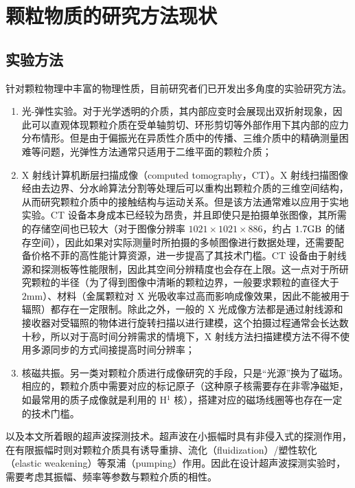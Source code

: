\section{颗粒物质的研究方法现状}


\subsection{实验方法}

针对颗粒物理中丰富的物理性质，目前研究者们已开发出多角度的实验研究方法。

\begin{enumerate}
  \item 光-弹性实验\cite{photoelasticimetry}。对于光学透明的介质，其内部应变时会展现出双折射现象，因此可以直观体现颗粒介质在受单轴剪切、环形剪切等外部作用下其内部的应力分布情形。但是由于偏振光在异质性介质中的传播、三维介质中的精确测量困难等问题\cite{Non-Destructive_3D_Photoelasticity}，光弹性方法通常只适用于二维平面的颗粒介质；
  \item X 射线计算机断层扫描成像（computed tomography，CT）\cite{PhysRevE.68.020301}。X 射线扫描图像经由去边界、分水岭算法分割等处理后可以重构出颗粒介质的三维空间结构，从而研究颗粒介质中的接触结构与运动关系。但是该方法通常难以应用于实地实验。CT 设备本身成本已经较为昂贵，并且即使只是拍摄单张图像，其所需的存储空间也已较大（对于图像分辨率 $1021\times 1021 \times 886$，约占 $1.7\unit{\giga\byte}$ 的储存空间\cite{xujiazhao}），因此如果对实际测量时所拍摄的多帧图像进行数据处理，还需要配备价格不菲的高性能计算资源，进一步提高了其技术门槛。CT 设备由于射线源和探测板等性能限制，因此其空间分辨精度也会存在上限。这一点对于所研究颗粒的半径（为了得到图像中清晰的颗粒边界，一般要求颗粒的直径大于 $2\unit{\milli\meter}$）、材料（金属颗粒对 X 光吸收率过高而影响成像效果，因此不能被用于辐照）都存在一定限制。除此之外，一般的 X 光成像方法都是通过射线源和接收器对受辐照的物体进行旋转扫描以进行建模，这个拍摄过程通常会长达数十秒，所以对于高时间分辨需求的情境下，X 射线方法扫描建模方法不得不使用多源同步\cite{wang2008ultrafast}的方式间接提高时间分辨率；
  \item 核磁共振\cite{CLARKE2023}。另一类对颗粒介质进行成像研究的手段，只是“光源”换为了磁场。相应的，颗粒介质中需要对应的标记原子（这种原子核需要存在非零净磁矩，如最常用的质子成像就是利用的 H$^{1}$ 核），搭建对应的磁场线圈等也存在一定的技术门槛。
\end{enumerate}

以及本文所着眼的超声波探测技术。超声波在小振幅时具有非侵入式的探测作用，在有限振幅时则对颗粒介质具有诱导重排\cite{PhysRevE.84.020301}、流化（fluidization）/塑性软化（elastic weakening）\cite{PhysRevE.84.020301}等泵浦（pumping）作用。因此在设计超声波探测实验时，需要考虑其振幅、频率等参数与颗粒介质的相性。

